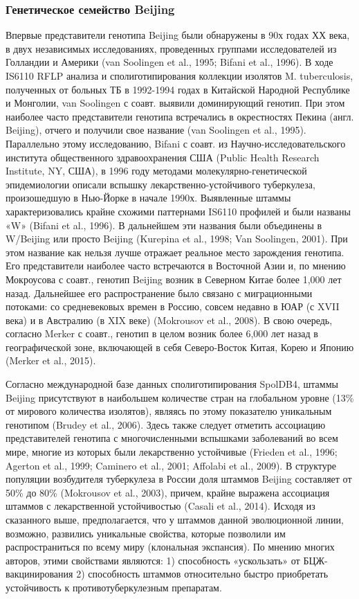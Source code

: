 \subsubsection{Генетическое семейство Beijing}
Впервые представители генотипа Beijing были обнаружены в 90х годах ХХ века, в двух независимых исследованиях, проведенных группами исследователей из Голландии и Америки (van Soolingen et al., 1995; Bifani et al., 1996). В ходе IS6110 RFLP анализа и сполиготипирования коллекции изолятов M. tuberculosis, полученных от больных ТБ в 1992-1994 годах в Китайской Народной Республике и Монголии, van Soolingen с соавт. выявили доминирующий генотип. При этом наиболее часто представители генотипа встречались в окрестностях Пекина (англ. Beijing), отчего и получили свое название (van Soolingen et al., 1995). Параллельно этому исследованию, Bifani с соавт. из Научно-исследовательского института общественного здравоохранения США (Public Health Research Institute, NY, США), в 1996 году методами молекулярно-генетической эпидемиологии описали вспышку лекарственно-устойчивого туберкулеза, произошедшую в Нью-Йорке в начале 1990х. Выявленные штаммы характеризовались крайне схожими паттернами IS6110 профилей и были названы «W» (Bifani et al., 1996). В дальнейшем эти названия были объединены в W/Beijing или просто Beijing (Kurepina et al., 1998; Van Soolingen, 2001). При этом название как нельзя лучше отражает реальное место зарождения генотипа. Его представители наиболее часто встречаются в Восточной Азии и, по мнению Мокроусова с соавт., генотип Beijing возник в Северном Китае более 1,000 лет назад. Дальнейшее его распространение было связано с миграционными потоками: со средневековых времен в Россию, совсем недавно в ЮАР (с XVII века) и в Австралию (в XIX веке) (Mokrousov et al., 2008). В свою очередь, согласно Merker с соавт., генотип в целом возник более 6,000 лет назад в географической зоне, включающей в себя Северо-Восток Китая, Корею и Японию (Merker et al., 2015).

Согласно международной базе данных сполиготипирования SpolDB4, штаммы Beijing присутствуют в наибольшем количестве стран на глобальном уровне (13\% от мирового количества изолятов), являясь по этому показателю уникальным генотипом (Brudey et al., 2006). Здесь также следует отметить ассоциацию представителей генотипа с многочисленными вспышками заболеваний во всем мире, многие из которых были лекарственно устойчивые (Frieden et al., 1996; Agerton et al., 1999; Caminero et al., 2001; Affolabi et al., 2009). В структуре популяции возбудителя туберкулеза в России доля штаммов Beijing составляет от 50\% до 80\% (Mokrousov et al., 2003), причем, крайне выражена ассоциация штаммов с лекарственной устойчивостью (Casali et al., 2014). Исходя из сказанного выше, предполагается, что у штаммов данной эволюционной линии, возможно, развились уникальные свойства, которые позволили им распространиться по всему миру (клональная экспансия). По мнению многих авторов, этими свойствами являются: 1) способность «ускользать» от БЦЖ-вакцинирования 2) способность штаммов относительно быстро приобретать устойчивость к противотуберкулезным препаратам.



